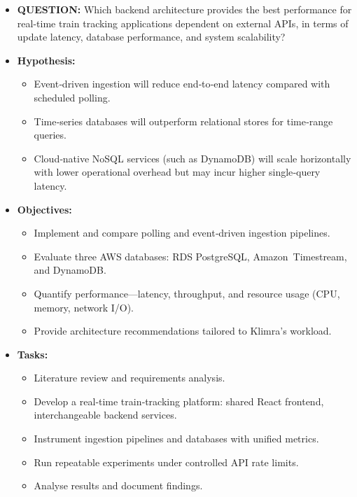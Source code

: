 \documentclass[11pt]{article}
\begin{document}
\begin{itemize}[leftmargin=*, label={}]
  \item \textbf{QUESTION:} Which backend architecture provides the best performance for real-time train tracking applications dependent on external APIs, in terms of update latency, database performance, and system scalability?

  \item \textbf{Hypothesis:}
        \begin{itemize}
            \item Event‑driven ingestion will reduce end‑to‑end latency compared with scheduled polling.
            \item Time‑series databases will outperform relational stores for time‑range queries.
            \item Cloud‑native NoSQL services (such as DynamoDB) will scale horizontally with lower operational overhead but may incur higher single‑query latency.
        \end{itemize}

  
  \item \textbf{Objectives:}
        \begin{itemize}
            \item Implement and compare polling and event‑driven ingestion pipelines.
            \item Evaluate three AWS databases: RDS PostgreSQL, Amazon Timestream, and DynamoDB.
            \item Quantify performance—latency, throughput, and resource usage (CPU, memory, network I/O).
            \item Provide architecture recommendations tailored to Klimra’s workload.
        \end{itemize}
  

  \item \textbf{Tasks:}
        \begin{itemize}
            \item Literature review and requirements analysis.
            \item Develop a real‑time train‑tracking platform: shared React frontend, interchangeable backend services.
            \item Instrument ingestion pipelines and databases with unified metrics.
            \item Run repeatable experiments under controlled API rate limits.
            \item Analyse results and document findings.
        \end{itemize}
  

\end{itemize}
\end{document}
